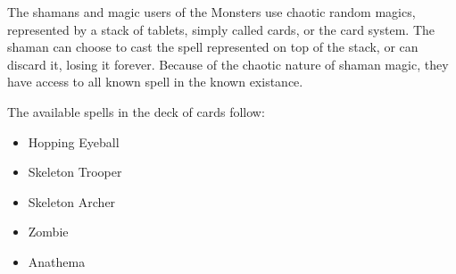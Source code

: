 \documentclass[a4paper]{article}
\begin{document}
The shamans and magic users of the Monsters use chaotic random magics, represented by a stack of tablets, simply called cards, or the card system. The shaman can choose to cast the spell represented on top of the stack, or can discard it, losing it forever. Because of the chaotic nature of shaman magic, they have access to all known spell in the known existance.

The available spells in the deck of cards follow:

\begin{itemize}
\item Hopping Eyeball
\item Skeleton Trooper
\item Skeleton Archer
\item Zombie
\item Anathema
\end{itemize}
\end{document}
